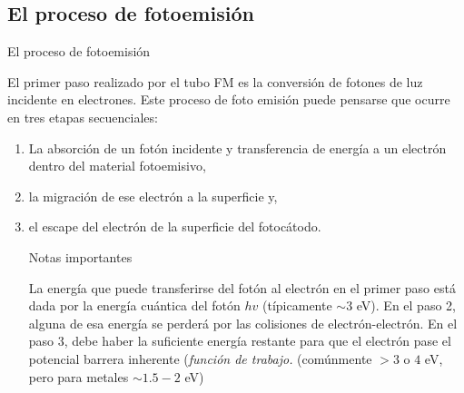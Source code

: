 \documentclass[a4paper,10pt]{beamer}
\begin{document}
\subsection{El proceso de fotoemisión}
\begin{frame}{El proceso de fotoemisión}
 
 \begin{justify}
  El primer paso realizado por el tubo FM es la conversión de fotones de luz incidente
  en electrones. Este proceso de foto emisión puede pensarse que ocurre en tres etapas
  secuenciales:
  
   \begin{enumerate} [<+->]
  \item La absorción de un fotón incidente y transferencia de energía a un electrón
  dentro del material fotoemisivo,
  \item la migración de ese electrón a la superficie y,
  \item el escape del electrón de la superficie del fotocátodo. 
  \begin{block}{Notas importantes}
  \footnotesize{\begin{justify}La energía que puede transferirse del fotón al electrón en el primer paso está
  dada por la energía cuántica del fotón $hv$ (típicamente $\sim 3$ eV). En el paso 2, alguna de esa energía
  se perderá por las colisiones de electrón-electrón. En el paso 3, debe haber
  la suficiente energía restante para que el electrón pase el potencial barrera
  inherente (\emph{función de trabajo.} (comúnmente $> 3$ o $4$ eV, pero para 
  metales $\sim 1.5-2$ eV)\end{justify}}
 \end{block}
 \end{enumerate}
 
 \end{justify}
  
\end{frame}
\end{document}
